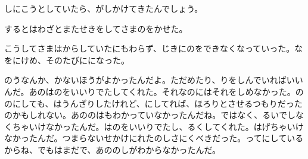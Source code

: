 しにこうとしていたら、がしかけてきたんでしょう。

するとはわざとまたせきをしてさまのをかせた。

こうしてさまはからしていたにもわらず、じきにのをできなくなっていった。なをにけめ、そのたびにになった。

のうなんか、かないほうがよかったんだよ。ただめたり、りをしんでいればいいんだ。あのはのをいいりでたしてくれた。それなのにはそれをしめなかった。ののにしても、はうんざりしたけれど、にしてれば、ほろりとさせるつもりだったのかもしれない。あののはもわかっていなかったんだね。ではなく、るいでしなくちゃいけなかったんだ。はのをいいりでたし、るくしてくれた。はげちゃいけなかったんだ。つまらないせかけにれたのしさにくべきだった。ってにしているからね、でもはまだで、あののしがわからなかったんだ。


